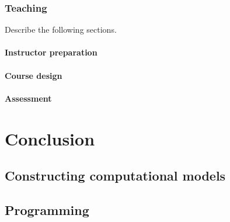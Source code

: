\documentclass{msuphddissertation}
\begin{document}
\begin{doublespace}
\subsection{Teaching}

Describe the following sections.

\subsubsection{Instructor preparation}

\subsubsection{Course design}

\subsubsection{Assessment}

%
%

\chapter{Conclusion}\label{CH7:Conclusion}

%
%

\appendices\label{Appendix}

\section*{Constructing computational models}

\section*{Programming}

%
%

\end{doublespace}



\end{document}
